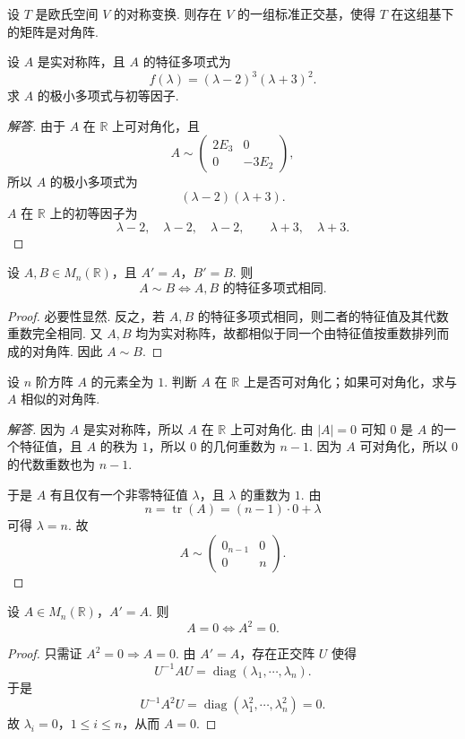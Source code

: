 \begin{corollary}
	设 $T$ 是欧氏空间 $V$ 的对称变换. 则存在 $V$ 的一组标准正交基，使得 $T$ 在这组基下的矩阵是对角阵.
\end{corollary}

\begin{example}
	设 $A$ 是实对称阵，且 $A$ 的特征多项式为
	\[
	f(\lambda)=(\lambda-2)^3(\lambda+3)^2.
	\]
	求 $A$ 的极小多项式与初等因子.
\end{example}
\begin{proof}[解答]
	由于 $A$ 在 $\mathbb{R}$ 上可对角化，且
	\[
	A\sim\begin{pmatrix}
		2E_3&0\\
		0&-3E_2
	\end{pmatrix},
	\]
	所以 $A$ 的极小多项式为
	\[
	(\lambda-2)(\lambda+3).
	\]
	$A$ 在 $\mathbb{R}$ 上的初等因子为
	\[
	\lambda-2,\quad \lambda-2,\quad \lambda-2,
	\qquad
	\lambda+3,
	\quad
	\lambda+3.
	\]
\end{proof}

\begin{example}
	设 $A,B\in M_n(\mathbb{R})$，且 $A'=A$，$B'=B$. 则
	\[
	A\sim B\Longleftrightarrow A,B\text{ 的特征多项式相同}.
	\]
\end{example}
\begin{proof}
	必要性显然. 反之，若 $A,B$ 的特征多项式相同，则二者的特征值及其代数重数完全相同. 又 $A,B$ 均为实对称阵，故都相似于同一个由特征值按重数排列而成的对角阵. 因此 $A\sim B$.
\end{proof}

\begin{example}
	设 $n$ 阶方阵 $A$ 的元素全为 $1$. 判断 $A$ 在 $\mathbb{R}$ 上是否可对角化；如果可对角化，求与 $A$ 相似的对角阵.
\end{example}
\begin{proof}[解答]
	因为 $A$ 是实对称阵，所以 $A$ 在 $\mathbb{R}$ 上可对角化. 由 $|A|=0$ 可知 $0$ 是 $A$ 的一个特征值，且 $A$ 的秩为 $1$，所以 $0$ 的几何重数为 $n-1$. 因为 $A$ 可对角化，所以 $0$ 的代数重数也为 $n-1$.
	
	于是 $A$ 有且仅有一个非零特征值 $\lambda$，且 $\lambda$ 的重数为 $1$. 由
	\[
	n=\operatorname{tr}(A)=(n-1)\cdot0+\lambda
	\]
	可得 $\lambda=n$. 故
	\[
	A\sim\begin{pmatrix}
		0_{n-1}&0\\
		0&n
	\end{pmatrix}.
	\]
\end{proof}

\begin{example}
	设 $A\in M_n(\mathbb{R})$，$A'=A$. 则
	\[
	A=0\Longleftrightarrow A^2=0.
	\]
\end{example}
\begin{proof}
	只需证 $A^2=0\Rightarrow A=0$. 由 $A'=A$，存在正交阵 $U$ 使得
	\[
	U^{-1}AU=\operatorname{diag}(\lambda_1,\cdots,\lambda_n).
	\]
	于是
	\[
	U^{-1}A^2U=\operatorname{diag}(\lambda_1^2,\cdots,\lambda_n^2)=0.
	\]
	故 $\lambda_i=0$，$1\leq i\leq n$，从而 $A=0$.
\end{proof}

